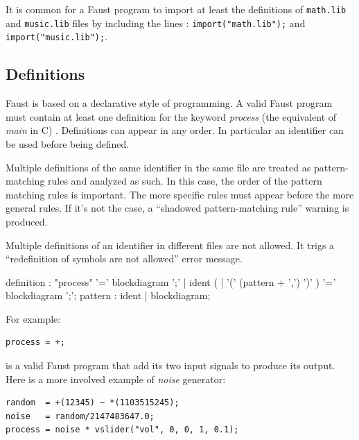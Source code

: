 \documentclass{article}
\begin{document}
 
It is common for a Faust program to import at least the definitions of \lstinline'math.lib' and \lstinline'music.lib' files by including the lines : \lstinline{import("math.lib");} and  \lstinline{import("music.lib");}.


\subsection{Definitions}
Faust is based on a declarative style of programming. A valid Faust program must contain at least one definition for the keyword \emph{process}  (the equivalent of \emph{main} in C) . Definitions can appear in any order. In particular an identifier can be used before being defined. 

Multiple definitions of the same identifier in the same file are treated as pattern-matching rules and analyzed as such. In this case, the order of the pattern matching rules is important. The more specific rules must appear before the more general rules. If it's not the case, a ``shadowed pattern-matching rule'' warning is produced.

Multiple definitions of an identifier in different files are not allowed. It trigs a ``redefinition of symbols are not allowed'' error message.

\begin{rail}
definition  : "process" '=' blockdiagram ';'
      | ident (  | '(' (pattern + ',') ')' ) '=' blockdiagram ';';
pattern : ident | blockdiagram;
\end{rail}

%


For example: 

\begin{lstlisting}
process = +;
\end{lstlisting}

is a valid Faust program that add its two input signals to produce its output. Here is a more involved example of \emph{noise} generator:

\begin{lstlisting}
random  = +(12345) ~ *(1103515245);
noise   = random/2147483647.0;
process = noise * vslider("vol", 0, 0, 1, 0.1);
\end{lstlisting}
\end{document}
